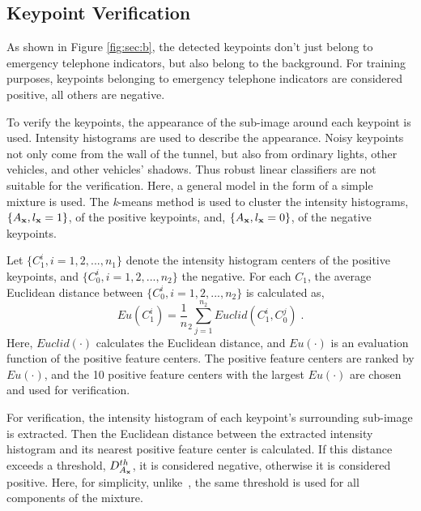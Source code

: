 \subsection{Keypoint Verification}


As shown in Figure \ref{fig:sec:b}, the detected keypoints don't just belong to emergency telephone indicators, but also belong to the background. For training purposes, keypoints belonging to emergency telephone indicators are considered  positive, all others are negative.

To verify the keypoints, the appearance of the sub-image around each keypoint is used. Intensity histograms are used to describe the appearance. Noisy keypoints not only come from the wall of the tunnel, but also from ordinary lights, other vehicles, and other vehicles' shadows. Thus robust linear classifiers are not suitable for the verification. Here, a general model in the form of a simple mixture is used. The \emph{k}-means method is used to cluster the intensity histograms, $\{A_{\bf{x}},l_{\bf{x}}=1\}$, of the positive keypoints, and, $\{A_{\bf{x}},l_{\bf{x}}=0\}$,  of
the negative keypoints.

Let $\{C_1^i,i=1,2,...,n_1\}$ denote the intensity histogram centers of the positive keypoints, and $\{C_0^i,i=1,2,...,n_2\}$ the negative. For each $C_1$, the average Euclidean distance between $\{C_0^i,i=1,2,...,n_2\}$ is calculated as,
\begin{equation}
Eu(C_1^i)={\frac 1 n_2}\sum\limits^{n_2}_{j=1}Euclid(C_1^i,C_0^j)\;.
\label{eq2}
\end{equation}
Here, $Euclid(\cdot)$ calculates the Euclidean distance, and $Eu(\cdot)$ is an evaluation function of the positive feature centers. The positive feature centers are ranked by $Eu(\cdot)$, and the 10 positive feature centers with the largest $Eu(\cdot)$ are chosen and used for verification.

For verification, the intensity histogram of each keypoint's surrounding sub-image is extracted. Then the Euclidean distance between the extracted intensity histogram and its nearest positive feature center is calculated. If this distance exceeds a threshold, $D^{th}_{A_{\bf{x}}}$, it is considered negative, otherwise it is considered positive. Here, for simplicity, unlike~\citep{ac33}, the same threshold is used for all components of the mixture.


